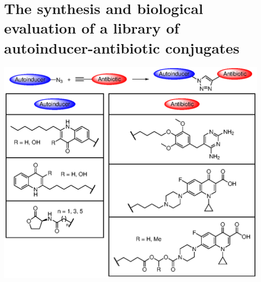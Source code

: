 \documentclass[10pt,a4paper]{article}
\begin{document}
\section*{The synthesis and biological evaluation of a library of autoinducer-antibiotic conjugates}
	
\begin{scheme}[H]
	\begin{center}
		\includegraphics[scale=1]{Summary_1}
		\caption{}
	\end{center}
\end{scheme}

{}

\end{document}
